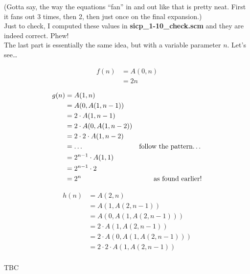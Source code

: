 \documentclass{report}
\begin{document}
(Gotta say, the way the equations ``fan'' in and out like that is pretty neat. First it fans out 3 times, then 2, then just once on the final expansion.) \\

Just to check, I computed these values in \textbf{sicp\_1-10\_check.scm} and they are indeed correct. Phew! \\

The last part is essentially the same idea, but with a variable parameter $n$. Let's see\dots

\begin{align*}
  f(n) &= A(0, n) \\
       &= 2n
\end{align*}

\begin{align*}
  g(n) &= A(1, n) \\
       &= A(0, A(1, n - 1)) \\
       &= 2 \cdot A(1, n - 1) \\
       &= 2 \cdot A(0, A(1, n - 2)) \\
       &= 2 \cdot 2 \cdot A(1, n - 2) \\
       &= \dots & \text{follow the pattern\dots} \\
       &= 2^{n - 1} \cdot A(1, 1) \\
       &= 2^{n - 1} \cdot 2 \\
       &= 2^n & \text{as found earlier!}
\end{align*}

\begin{align*}
  h(n) &= A(2, n) \\
       &= A(1, A(2, n - 1)) \\
       &= A(0, A(1, A(2, n - 1))) \\
       &= 2 \cdot A(1, A(2, n - 1)) \\
       &= 2 \cdot A(0, A(1, A(2, n - 1))) \\
       &= 2 \cdot 2 \cdot A(1, A(2, n - 1)) \\
\end{align*}

TBC
\end{document}
